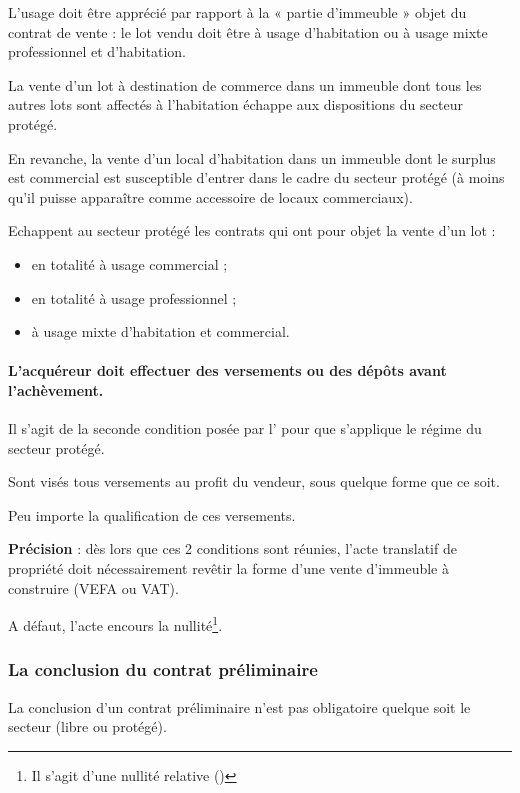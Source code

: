 			L'usage doit être apprécié par rapport à la « partie d'immeuble » objet du contrat de vente : le lot vendu doit être à usage d'habitation ou à usage mixte professionnel et d'habitation.

			La vente d'un lot à destination de commerce dans un immeuble dont tous les autres lots sont affectés à l'habitation échappe aux dispositions du secteur protégé.

			En revanche, la vente d'un local d'habitation dans un immeuble dont le surplus est commercial est susceptible d'entrer dans le cadre du secteur protégé (à moins qu'il puisse apparaître comme accessoire de locaux commerciaux).

			Echappent au secteur protégé les contrats qui ont pour objet la vente d’un lot :
			\begin{itemize}
				\item en totalité à usage commercial ;
				\item en totalité à usage professionnel ;
				\item à usage mixte d’habitation et commercial.
			\end{itemize}


			\paragraph{L’acquéreur doit effectuer des versements ou des dépôts avant l'achèvement.}

			Il s’agit de la seconde condition posée par l' pour que s'applique le régime du secteur protégé.

			Sont visés tous versements au profit du vendeur, sous quelque forme que ce soit.

			Peu importe la qualification de ces versements.

			\bigskip \textbf{Précision} : dès lors que ces 2 conditions sont réunies, l’acte translatif de propriété doit nécessairement revêtir la forme d’une vente d’immeuble à construire (VEFA ou VAT).

			A défaut, l’acte encours la nullité\footnote{Il s’agit d’une nullité relative ()}.


		\subsubsection{La conclusion du contrat préliminaire}

			La conclusion d’un contrat préliminaire n’est pas obligatoire quelque soit le secteur (libre ou protégé).

